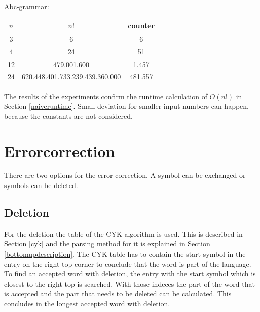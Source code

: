 \documentclass[a4paper, 11pt]{article}
\begin{document}
\pagebreak
Abc-grammar: 

\begin{tabular}{|c|c|c|}
\hline
$n$ & $n!$ & counter \\
\hline
3& 6 & 6\\
4& 24 & 51\\
12& 479.001.600 & 1.457\\
24& 620.448.401.733.239.439.360.000 & 481.557\\
\hline
\end{tabular}

The results of the experiments confirm the runtime calculation of $O(n!)$ in Section \ref{naiveruntime}. Small deviation for smaller input numbers can happen, because the constants are not considered.











\pagebreak










\section{Errorcorrection}
\label{errorcorrection}

There are two options for the error correction. A symbol can be exchanged or symbols can be deleted. 





\subsection{Deletion}
\label{deletion}

For the deletion the table of the CYK-algorithm is used. This is described in Section \ref{cyk} and the parsing method for it is explained in Section \ref{bottomupdescription}.
The CYK-table has to contain the start symbol in the entry on the right top corner to conclude that the word is part of the language. To find an accepted word with deletion, the entry with the start symbol which is closest to the right top is searched. With those indeces the part of the word that is accepted and the part that needs to be deleted can be calculated. This concludes in the longest accepted word with deletion.
\end{document}
